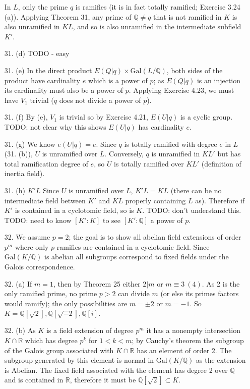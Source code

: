 \documentclass{article}
\newcommand{\Q}[0]{\mathbb{Q}}
\newcommand{\R}[0]{\mathbb{R}}
\newcommand{\modequiv}[3]{#1 \equiv #2\ (#3)}
\newcommand{\gal}[2]{\text{Gal}(#1 / #2)}
\begin{document}
\begin{enumerate}
In $L$, only the prime $q$ is ramifies (it is in fact totally ramified; Exercise 3.24 (a)).  Applying Theorem 31, any prime of $\Q \neq q$ that is not ramified in $K$ is also unramified in $KL$, and so is also unramified in the intermediate subfield $K'$.

\item [31. (d)] TODO - easy
\item [31. (e)] In the direct product $E(Q|q) \times \gal{L}{\Q}$, both sides of the product have cardinality $e$ which is a power of $p$; as $E(Q|q)$ is an injection its cardinality must also be a power of $p$.  Applying Exercise 4.23, we must have $V_1$ trivial ($q$ does not divide a power of $p$).
\item [31. (f)] By (e), $V_1$ is trivial so by Exercise 4.21, $E(U|q)$ is a cyclic group.  TODO: not clear why this shows $E(U|q)$ has cardinality $e$.

\item [31. (g)] We know $e(U|q) = e$.  Since $q$ is totally ramified with degree $e$ in $L$ (31. (b)), $U$ is unramified over $L$.  Conversely, $q$ is unramified in $KL'$ but has total ramification degree of $e$, so $U$ is totally ramified over $KL'$ (definition of inertia field).

\item [31. (h)] $K'L$ Since $U$ is unramified over $L$, $K'L  = KL$ (there can be no intermediate field between $K'$ and $KL$ properly containing $L$ as).  Therefore if $K'$ is contained in a cyclotomic field, so is $K$.  TODO: don't understand this.  TODO: need to know $[K':K]$ to see $[K':\Q]$ a power of $p$.

\item [32.]  We assume $p = 2$; the goal is to show all abelian field extensions of order $p^m$ where only $p$ ramifies are contained in a cyclotomic field.  Since $\gal{K}{\Q}$ is abelian all subgroups correspond to fixed fields under the Galois correspondence.

\item [32. (a)] If $m = 1$, then by Theorem 25 either $2 | m$ or $\modequiv{m}{3}{4}$.  As 2 is the only ramified prime, no prime $p > 2$ can divide $m$ (or else its primes factors would ramify); the only possibilities are $m = \pm 2$ or $m = -1$.  So $K = \Q[\sqrt{2}], \Q[\sqrt{-2}], \Q[i]$.

\item[32. (b)] As $K$ is a field extension of degree $p^m$ it has a nonempty intersection $K \cap \R$ which has degree $p^k$ for $1 < k < m$; by Cauchy's theorem the subgroup of the Galois group associated with $K \cap \R$ has an element of order 2.  The subgroup generated by this element is normal in $\gal{K}{\Q}$ as the extension is Abelian.  The fixed field associated with the element has degree 2 over $\Q$ and is contained in $\R$, therefore it must be $\Q[\sqrt{2}] \subset K$.


\end{enumerate}
\end{document}
